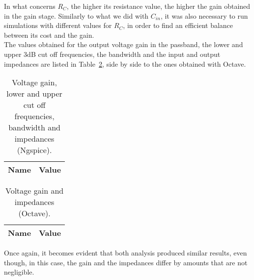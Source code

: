 In what concerns $R_C$, the higher its resistance value, the higher the gain obtained in the gain stage. Similarly to what we did with $C_{in}$, it was also necessary to run simulations with different values for $R_C$, in order to find an efficient balance between its cost and the gain. \\

The values obtained for the output voltage gain in the passband, the lower and upper 3dB cut off frequencies, the bandwidth and the input and output impedances are listed in Table~\ref{tab:spice}, side by side to the ones obtained with Octave.

\vspace{5mm}

\noindent
\begin{minipage}[c]{0.5\linewidth}

\begin{table}[H]
 \centering
 \begin{tabular}{|l|r|}
 \hline
 {\bf Name} & {\bf Value} \\ \hline


 \end{tabular}
 \caption{Voltage gain, lower and upper cut off frequencies, bandwidth and impedances (Ngspice).}
 \label{tab:spice}
 \end{table}
 
\end{minipage}
\begin{minipage}[c]{0.5\linewidth}

\vspace{-5mm}
 
 \begin{table}[H]
 \centering
 \begin{tabular}{|l|r|}
 \hline
 {\bf Name} & {\bf Value} \\ \hline


 \end{tabular}
 \caption{Voltage gain and impedances (Octave).}
 \label{tab:spice}
 \end{table}
 
\end{minipage}

\vspace{10mm}

Once again, it becomes evident that both analysis produced similar results, even though, in this case, the gain and the impedances differ by amounts that are not negligible. \\

